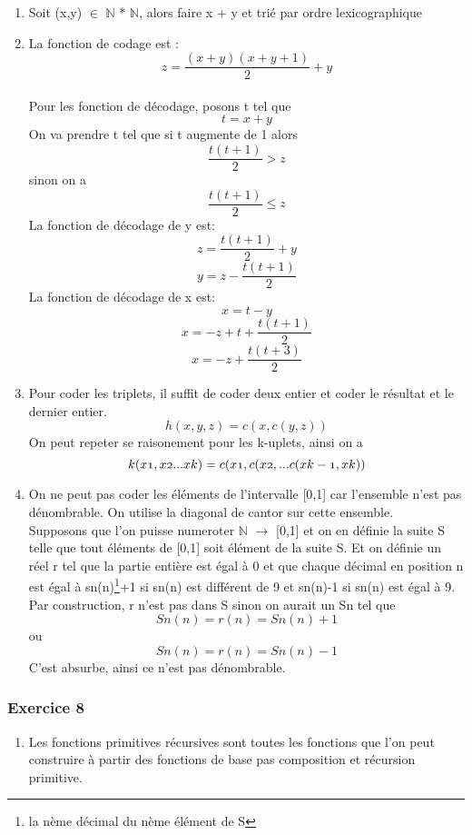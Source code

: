 \documentclass[]{article}
\begin{document}
\begin{enumerate}
\begin{enumerate}
\item Soit (x,y) $\in$ $\mathbb{N}$ * $\mathbb{N}$, alors faire x + y et trié par ordre lexicographique
\item La fonction de codage est : \[z = \frac{(x+y)(x+y+1)}{2} + y\]\\
Pour les fonction de décodage, posons t tel que \[t = x + y\]
On va prendre t tel que si t augmente de 1 alors \[\frac{t(t+1)}{2} > z\] sinon on a \[\frac{t(t+1)}{2} \le z\]
La fonction de décodage de y est: \[z =\frac{t(t+1)}{2} + y\] \[y = z - \frac{t(t+1)}{2}\]
La fonction de décodage de x est: \[x = t - y\] \[x = -z + t + \frac{t(t+1)}{2}\] \[x = -z + \frac{t(t+3)}{2}\]
\item Pour coder les triplets, il suffit de coder deux entier et coder le résultat et le dernier entier. 
  \[h(x,y,z)=c(x , c(y,z))\]
On peut repeter se raisonement pour les k-uplets, ainsi on a 
\[k(x\oldstylenums{1},x\oldstylenums{2}... x\oldstylenums{k}) = c(x\oldstylenums{1} , c(x\oldstylenums{2} , ... c(x\oldstylenums{k-1},x\oldstylenums{k}))\]
\item On ne peut pas coder les éléments de l'intervalle [0,1] car l'ensemble n'est pas dénombrable. On utilise la diagonal de cantor sur cette ensemble.\\
Supposons que l'on puisse numeroter $\mathbb{N}$  $\rightarrow$ [0,1] et on en définie la suite S telle que tout éléments de [0,1] soit élément de la suite S.
Et on définie un réel r tel que la partie entière est égal à 0 et que chaque décimal en position n est égal à sn(n)\footnote{la nème décimal du nème élément de S}+1 si sn(n) est différent de 9 et sn(n)-1 si sn(n) est égal à 9.\\
Par construction, r n'est pas dans S sinon on aurait un Sn tel que \[Sn(n)=r(n)=Sn(n)+1\] ou \[Sn(n)=r(n)=Sn(n)-1\] C'est absurbe, ainsi ce n'est pas dénombrable. 
   
  
\end{enumerate}




\subsubsection{Exercice 8}
\begin{enumerate}
\item Les fonctions primitives récursives sont toutes les fonctions que l'on peut construire à partir des fonctions de base pas composition et récursion primitive.\\


\end{enumerate}
\end{enumerate}
\end{document}
